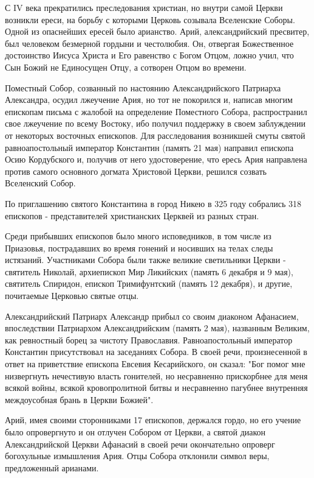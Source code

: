 С IV века прекратились преследования христиан, но внутри самой Церкви возникли
ереси, на борьбу с которыми Церковь созывала Вселенские Соборы. Одной из
опаснейших ересей было арианство. Арий, александрийский пресвитер, был
человеком безмерной гордыни и честолюбия. Он, отвергая Божественное достоинство
Иисуса Христа и Его равенство с Богом Отцом, ложно учил, что Сын Божий не
Единосущен Отцу, а сотворен Отцом во времени. 

Поместный Собор, созванный по настоянию Александрийского Патриарха Александра,
осудил лжеучение Ария, но тот не покорился и, написав многим епископам письма с
жалобой на определение Поместного Собора, распространил свое лжеучение по всему
Востоку, ибо получил поддержку в своем заблуждении от некоторых восточных
епископов. Для расследования возникшей смуты святой равноапостольный император
Константин (память 21 мая) направил епископа Осию Кордубского и, получив от
него удостоверение, что ересь Ария направлена против самого основного догмата
Христовой Церкви, решился созвать Вселенский Собор.

 По приглашению святого Константина в город Никею в 325 году собрались 318
 епископов - представителей христианских Церквей из разных стран.

Среди прибывших епископов было много исповедников, в том числе из Приазовья,
пострадавших во время гонений и носивших на телах следы истязаний. Участниками
Собора были также великие светильники Церкви - святитель Николай, архиепископ
Мир Ликийских (память 6 декабря и 9 мая), святитель Спиридон, епископ
Тримифунтский (память 12 декабря), и другие, почитаемые Церковью святые отцы.

Александрийский Патриарх Александр прибыл со своим диаконом Афанасием,
впоследствии Патриархом Александрийским (память 2 мая), названным Великим, как
ревностный борец за чистоту Православия. Равноапостольный император Константин
присутствовал на заседаниях Собора. В своей речи, произнесенной в ответ на
приветствие епископа Евсевия Кесарийского, он сказал: "Бог помог мне
низвергнуть нечестивую власть гонителей, но несравненно прискорбнее для меня
всякой войны, всякой кровопролитной битвы и несравненно пагубнее внутренняя
междоусобная брань в Церкви Божией".

Арий, имея своими сторонниками 17 епископов, держался гордо, но его учение было
опровергнуто и он отлучен Собором от Церкви, а святой диакон Александрийской
Церкви Афанасий в своей речи окончательно опроверг богохульные измышления Ария.
Отцы Собора отклонили символ веры, предложенный арианами. 

